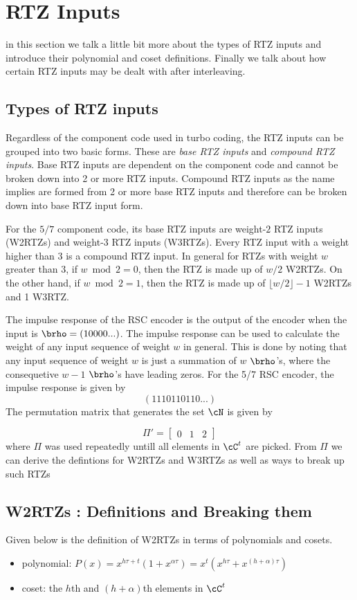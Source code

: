 \section{RTZ Inputs}
in this section we talk a little bit more about the types of  RTZ inputs and introduce their polynomial and coset definitions. Finally we talk about how certain RTZ inputs may be dealt with after interleaving.

\subsection{Types of RTZ inputs}
Regardless of the component code used in turbo coding, the RTZ inputs can be grouped into two basic forms. These are \textit{base RTZ inputs} and \textit{compound RTZ inputs}. Base RTZ inputs are dependent on the component code and cannot be broken down into 2 or more RTZ inputs. Compound RTZ inputs as the name implies are formed from 2 or more base RTZ inputs and therefore can be broken down into base RTZ input form.

For the $5/7$ component code, its base RTZ inputs are weight-$2$ RTZ inputs  (W2RTZs) and weight-$3$ RTZ inputs (W3RTZs). Every RTZ input with a weight higher than 3 is a compound RTZ input. In general for RTZs with weight $w$ greater than 3, if $w \bmod 2=0$, then the RTZ is made up of $w/2$ W2RTZs. On the other hand, if $w \bmod 2=1$, then the RTZ is made up of $\lfloor w/2 \rfloor -1$ W2RTZs and 1 W3RTZ.

The impulse response of the RSC encoder is the output of the encoder when the input is $\brho=(1 0 0 0 0 ...)$. The impulse response can be used to calculate the weight of any input sequence of weight $w$ in general. This is done by noting that any input sequence of weight $w$ is just a summation of $w$ $\brho$'s, where the consequetive $w-1$ $\brho$'s have leading zeros. 
For the 5/7 RSC encoder, the impulse response is given by $$(1 1 1 0 1 1 0 1 1 0 ...)$$
The permutation matrix that generates the set $\cN$ is given by 

$$\Pi'=\begin{bmatrix} 0 & 1 & 2 \end{bmatrix}$$ 
where $\Pi$ was used repeatedly untill all elements in $\cC^t$ are picked. From $\Pi$ we can derive the defintions for W2RTZs and W3RTZs as well as ways to break up such RTZs

\subsection{W2RTZs : Definitions and Breaking them}
Given below is the definition of W2RTZs in terms of polynomials and cosets.
\begin{itemize}
	\item polynomial: $P(x)=x^{h\tau+t}(1+x^{\alpha \tau}) = x^t(x^{h\tau}+x^{(h+\alpha)\tau})$
	\item coset: the $h$th and $(h+\alpha)$th elements in $\cC^t$
\end{itemize}


